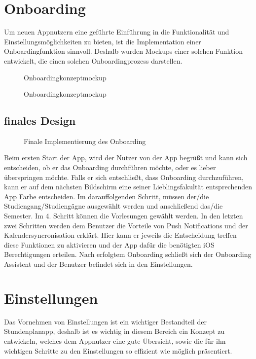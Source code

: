 \section{Onboarding}

Um neuen Appnutzern eine geführte Einführung in die Funktionalität und Einstellungsmöglichkeiten zu bieten, ist die Implementation einer Onboardingfunktion sinnvoll. Deshalb wurden Mockups einer solchen Funktion entwickelt, die einen solchen Onboardingprozess darstellen.

\begin{figure}[H]
	\centering
	\caption{Onboardingkonzeptmockup}
	\label{fig1}
\end{figure}

\begin{figure}[H]
	\centering
	\caption{Onboardingkonzeptmockup}
	\label{fig1}
\end{figure}

\subsection{finales Design}
\begin{figure}[H]
	\centering
	\caption{Finale Implementierung des Onboarding}
	\label{fig1}
\end{figure}

Beim ersten Start der App, wird der Nutzer von der App begrüßt und kann sich entscheiden, ob er das Onboarding durchführen möchte, oder es lieber überspringen möchte. Falls er sich entschließt, dass Onboarding durchzuführen, kann er auf dem nächsten Bildschirm eine seiner Lieblingsfakultät entsprechenden App Farbe entscheiden. Im darauffolgenden Schritt, müssen der/die Studiengang/Studiengägne ausgewählt werden und anschließend das/die Semester.  Im 4. Schritt können die Vorlesungen gewählt werden. In den letzten zwei Schritten werden dem Benutzer die Vorteile von Push Notifications und der Kalendersyncronisation erklärt. Hier kann er jeweils die Entscheidung treffen diese Funktionen zu aktivieren und der App dafür die benötigten iOS Berechtigungen erteilen. Nach erfolgtem Onboarding schließt sich der Onboarding Assistent und der Benutzer befindet sich in den Einstellungen.



\section{Einstellungen}
Das Vornehmen von Einstellungen ist ein wichtiger Bestandteil der Stundenplanapp, deshalb ist es wichtig in diesem Bereich ein Konzept zu entwickeln, welches dem Appnutzer eine gute Übersicht, sowie die für ihn wichtigen Schritte zu den Einstellungen so effizient wie möglich präsentiert.


